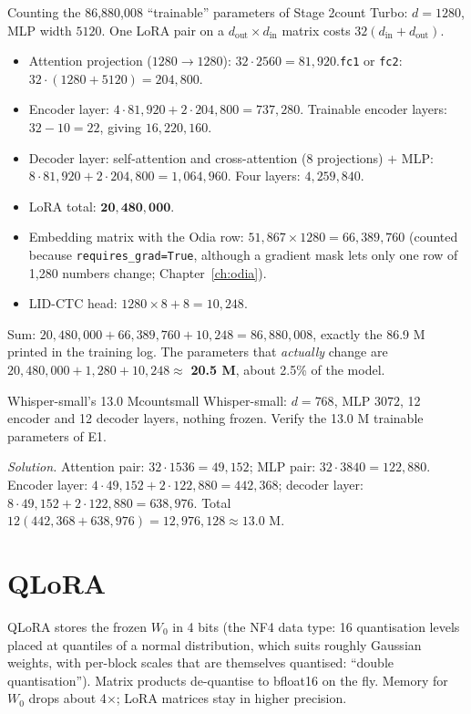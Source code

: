 \begin{example}{Counting the 86{,}880{,}008 ``trainable'' parameters of Stage 2}{count}
Turbo: $d=1280$, MLP width $5120$. One LoRA pair on a $d_{\text{out}}\times d_{\text{in}}$ matrix costs $32(d_{\text{in}}+d_{\text{out}})$.
\begin{itemize}
\item Attention projection ($1280\to1280$): $32\cdot2560=81{,}920$.\quad \texttt{fc1} or \texttt{fc2}: $32\cdot(1280+5120)=204{,}800$.
\item Encoder layer: $4\cdot81{,}920+2\cdot204{,}800=737{,}280$. Trainable encoder layers: $32-10=22$, giving $16{,}220{,}160$.
\item Decoder layer: self-attention and cross-attention ($8$ projections) $+$ MLP: $8\cdot81{,}920+2\cdot204{,}800=1{,}064{,}960$.
Four layers: $4{,}259{,}840$.
\item LoRA total: $\mathbf{20{,}480{,}000}$.
\item Embedding matrix with the Odia row: $51{,}867\times1280=66{,}389{,}760$ (counted because \texttt{requires\_grad=True}, although a
gradient mask lets only one row of 1{,}280 numbers change; Chapter~\ref{ch:odia}).
\item LID-CTC head: $1280\times8+8=10{,}248$.
\end{itemize}
Sum: $20{,}480{,}000+66{,}389{,}760+10{,}248=86{,}880{,}008$, exactly the 86.9 M printed in the training log. The parameters that
\emph{actually} change are $20{,}480{,}000+1{,}280+10{,}248\approx$ \textbf{20.5 M}, about 2.5\% of the model.
\end{example}

\begin{exercise}{Whisper-small's 13.0 M}{countsmall}
Whisper-small: $d=768$, MLP $3072$, 12 encoder and 12 decoder layers, nothing frozen. Verify the 13.0 M trainable parameters of E1.\par
\textit{Solution.} Attention pair: $32\cdot1536=49{,}152$; MLP pair: $32\cdot3840=122{,}880$. Encoder layer:
$4\cdot49{,}152+2\cdot122{,}880=442{,}368$; decoder layer: $8\cdot49{,}152+2\cdot122{,}880=638{,}976$.
Total $12(442{,}368+638{,}976)=12{,}976{,}128\approx13.0$ M.
\end{exercise}

\section{QLoRA}

QLoRA stores the frozen $W_0$ in 4 bits (the NF4 data type: 16 quantisation levels placed at quantiles of a normal distribution,
which suits roughly Gaussian weights, with per-block scales that are themselves quantised: ``double quantisation''). Matrix products
de-quantise to bfloat16 on the fly. Memory for $W_0$ drops about 4$\times$; LoRA matrices stay in higher precision.

